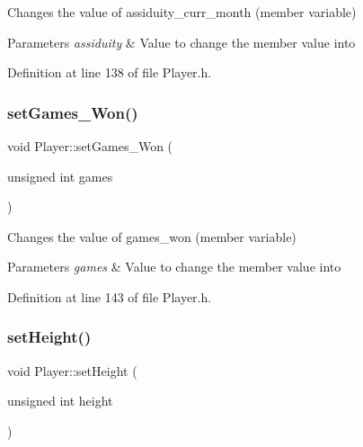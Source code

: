 Changes the value of assiduity\+\_\+curr\+\_\+month (member variable) 


\begin{DoxyParams}{Parameters}
{\em assiduity} & Value to change the member value into \\
\hline
\end{DoxyParams}


Definition at line 138 of file Player.\+h.

\hypertarget{class_player_a2ff08de789327f4b3aa82f15b354ee4e}{}\label{class_player_a2ff08de789327f4b3aa82f15b354ee4e} 
\subsubsection{\texorpdfstring{set\+Games\+\_\+\+Won()}{setGames\_Won()}}
{\footnotesize\ttfamily void Player\+::set\+Games\+\_\+\+Won (\begin{DoxyParamCaption}\item[{unsigned int}]{games }\end{DoxyParamCaption})\hspace{0.3cm}{\ttfamily [inline]}}



Changes the value of games\+\_\+won (member variable) 


\begin{DoxyParams}{Parameters}
{\em games} & Value to change the member value into \\
\hline
\end{DoxyParams}


Definition at line 143 of file Player.\+h.

\hypertarget{class_player_a217985fe6c76c9e91a91f4d1c1a82c11}{}\label{class_player_a217985fe6c76c9e91a91f4d1c1a82c11} 
\subsubsection{\texorpdfstring{set\+Height()}{setHeight()}}
{\footnotesize\ttfamily void Player\+::set\+Height (\begin{DoxyParamCaption}\item[{unsigned int}]{height }\end{DoxyParamCaption})\hspace{0.3cm}{\ttfamily [inline]}}



